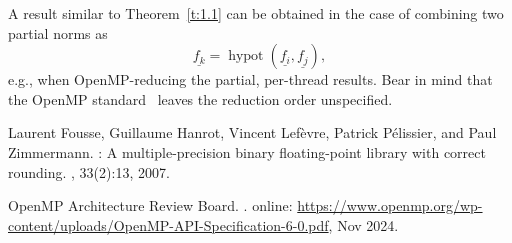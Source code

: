 \documentclass[a4paper,12pt,twoside]{article}
\begin{document}
A result similar to Theorem~\ref{t:1.1} can be obtained in the case of
combining two partial norms as
\begin{displaymath}
  \underline{f_k}=\mathop{\mathrm{hypot}}(\underline{f_i},\underline{f_j}),
\end{displaymath}
e.g., when OpenMP-reducing the partial, per-thread results.  Bear in
mind that the OpenMP standard~\cite[\S 7.6.7]{OpenMP6} leaves the
reduction order unspecified.
%
%
\begin{thebibliography}{1}

Laurent Fousse, Guillaume Hanrot, Vincent Lef\`{e}vre, Patrick P\'{e}lissier,
  and Paul Zimmermann.
: A multiple-precision binary floating-point library with
  correct rounding.
, 33(2):13, 2007.

{OpenMP Architecture Review Board}.
.
\newblock online:
  \url{https://www.openmp.org/wp-content/uploads/OpenMP-API-Specification-6-0.pdf},
  Nov 2024.

\end{thebibliography}
%
\end{document}
